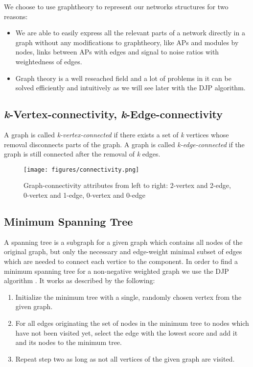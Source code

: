   We choose to use graphtheory to represent our networks structures for two reasons:
  \begin{itemize}
   \item We are able to easily express all the relevant parts of a network directly in a graph without any modifications to graphtheory,  
   like APs and modules by nodes, links between APs with edges and signal to noise ratios with weightedness of edges. 
    
   \item Graph theory is a well reseached field and a lot of problems in it can be solved efficiently and intuitively 
    as we will see later with the \ac{DJP} algorithm.
  \end{itemize}
    
  \subsection{\emph{k}-Vertex-connectivity, \emph{k}-Edge-connectivity}
    A graph is called \textit{k-vertex-connected} if there exists a set of \textit{k} vertices whose removal disconnects parts of the graph.
    A graph is called \textit{k-edge-connected} if the graph is still connected after the removal of \textit{k} edges.
    \begin{figure}[th!]
      \centering
      \texttt{[image: figures/connectivity.png]}
      \caption{Graph-connectivity attributes from left to right: 2-vertex and 2-edge, 0-vertex and 1-edge, 0-vertex and 0-edge}
      \label{fig:connectivity}
    \end{figure}
    
\newpage
    
  \subsection{Minimum Spanning Tree}
    A spanning tree is a subgraph for a given graph which contains all nodes of the original graph, but only the necessary and edge-weight minimal 
    subset of edges which are needed to connect each vertice to the component. In order to find a minimum spanning tree for a non-negative weighted 
    graph we use the \ac{DJP} algorithm \cite{prim} \cite{jarnik}. It works as described by the following:
    
    \begin{enumerate}
     \item Initialize the minimum tree with a single, randomly chosen vertex from the given graph.
     
     \item For all edges originating the set of nodes in the minimum tree to nodes which have not been visited yet, 
      select the edge with the lowest score and add it and its nodes to the minimum tree.
      
     \item Repeat step two as long as not all vertices of the given graph are visited.
    \end{enumerate}
    
